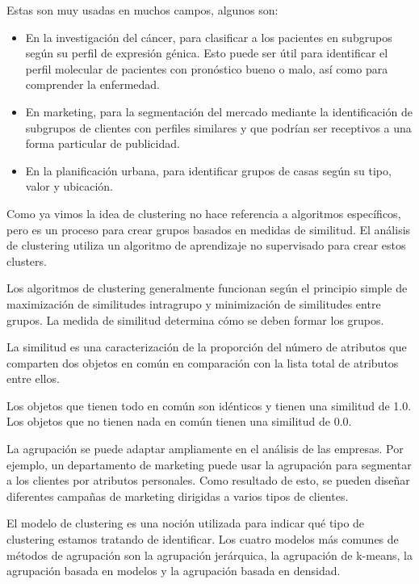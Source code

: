 \documentclass[12pt, fleqn]{report}                             %
\theoremstyle{break}                                            %
\begin{document}
        Estas son muy usadas en muchos campos, algunos son:
        \begin{itemize}
            \item En la investigación del cáncer, para clasificar a los pacientes en subgrupos según su 
            perfil de expresión génica. Esto puede ser útil para identificar el perfil molecular de 
            pacientes con pronóstico bueno o malo, así como para comprender la enfermedad.
            
            \item 
            En marketing, para la segmentación del mercado mediante la identificación de subgrupos de 
            clientes con perfiles similares y que podrían ser receptivos a una forma particular de publicidad.

            \item 
                En la planificación urbana, para identificar grupos de casas según su tipo, valor y ubicación.
        \end{itemize}

        Como ya vimos la idea de clustering no hace referencia a algoritmos específicos, 
        pero es un proceso para crear grupos basados ​​en medidas de similitud. 
        El análisis de clustering utiliza un algoritmo de aprendizaje no supervisado para crear estos clusters.

        Los algoritmos de clustering generalmente funcionan según el principio simple de maximización 
        de similitudes intragrupo y minimización de similitudes entre grupos. 
        La medida de similitud determina cómo se deben formar los grupos.

        La similitud es una caracterización de la proporción del número de atributos que 
        comparten dos objetos en común en comparación con la lista total de atributos entre ellos. 
        
        Los objetos que tienen todo en común son idénticos y tienen una similitud de 1.0. 
        Los objetos que no tienen nada en común tienen una similitud de 0.0.

        La agrupación se puede adaptar ampliamente en el análisis de las empresas. 
        Por ejemplo, un departamento de marketing puede usar la agrupación para segmentar 
        a los clientes por atributos personales. Como resultado de esto, 
        se pueden diseñar diferentes campañas de marketing dirigidas a varios tipos de clientes.

        El modelo de clustering es una noción utilizada para indicar qué tipo de clustering estamos 
        tratando de identificar. Los cuatro modelos más comunes de métodos de agrupación son la agrupación 
        jerárquica, la agrupación de k-means, la agrupación basada en modelos y la agrupación basada en densidad.
\end{document}
